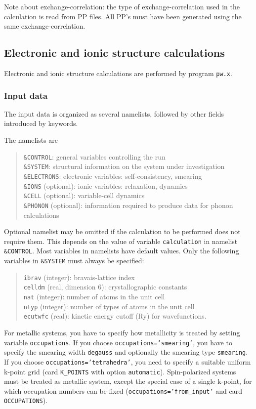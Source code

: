 \documentclass[12pt,a4paper]{article}
\begin{document}
Note about exchange-correlation: the type of exchange-correlation used
in the calculation is read from PP files.
All PP's must have been generated using the same exchange-correlation. 

\subsection{Electronic and ionic structure calculations}

Electronic and ionic structure calculations are performed by program
\texttt{pw.x}.

\subsubsection{Input data}

The input data is organized as several namelists, followed by other
fields introduced by keywords.

The namelists are 
\begin{quote}
  \texttt{\&CONTROL}: general variables controlling the run\\
  \texttt{\&SYSTEM}: structural information on the system under
    investigation\\
  \texttt{\&ELECTRONS}: electronic variables: self-consistency,
    smearing\\
  \texttt{\&IONS} (optional): ionic variables: relaxation,
    dynamics\\
  \texttt{\&CELL} (optional): variable-cell dynamics\\
  \texttt{\&PHONON} (optional): information required to produce
    data for phonon calculations
\end{quote}

Optional namelist may be omitted if the calculation to be performed
does not require them.
This depends on the value of variable \texttt{calculation} in namelist
\texttt{\&CONTROL}.
Most variables in namelists have default values.
Only the following variables in \texttt{\&SYSTEM} must always be
specified:
\begin{quote}
  \texttt{ibrav} (integer): bravais-lattice index\\
  \texttt{celldm} (real, dimension 6): crystallographic constants\\
  \texttt{nat} (integer): number of atoms in the unit cell\\
  \texttt{ntyp} (integer): number of types of atoms in the unit cell\\
  \texttt{ecutwfc} (real): kinetic energy cutoff (Ry) for
    wavefunctions.
\end{quote}
For metallic systems, you have to specify how metallicity
is treated by setting variable \texttt{occupations}. If you choose
\texttt{occupations='smearing'}, you have to specify the 
smearing width \texttt{degauss} and optionally the smearing 
type \texttt{smearing}. If you choose \texttt{occupations='tetrahedra'},
you need to specify a suitable uniform k-point grid (card 
\texttt{K\_POINTS} with option \texttt{automatic}). 
Spin-polarized systems must be treated as metallic system,
except the special case of a single k-point, for which
occupation numbers can be fixed (\texttt{occupations='from\_input'}
and card \texttt{OCCUPATIONS}).
\end{document}
